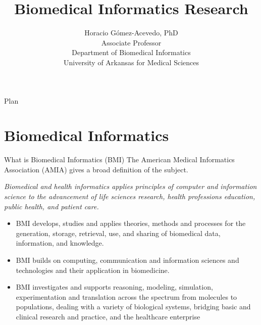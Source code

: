 \documentclass[11pt, aspectratio=43]{beamer}
\title{Biomedical Informatics Research}
\author{Horacio G\'omez-Acevedo, PhD\\ Associate Professor\\Department of Biomedical Informatics\\
	University of Arkansas for Medical Sciences}
\begin{document}
	\begin{frame}[plain]
		\maketitle
	\end{frame}

\begin{frame}{Plan}
	\tableofcontents[hideallsubsections]
\end{frame}

\section{Biomedical Informatics}

\begin{frame}{What is Biomedical Informatics (BMI)}		
	The American Medical Informatics Association (AMIA) gives a broad
	definition of the subject.
	
	{\it
		Biomedical and health informatics applies principles of computer and
		information science to the advancement of life sciences research, health
		professions education, public health, and patient care.}
	\begin{itemize}
		\item BMI develops, studies and applies theories, methods and processes for
		the generation, storage, retrieval, use, and sharing of biomedical data,
		information, and knowledge.
		\item BMI builds on computing, communication and information sciences
		and technologies and their application in biomedicine.
		\item BMI investigates and supports reasoning, modeling, simulation,
		experimentation and translation across the spectrum from molecules to
		populations, dealing with a variety of biological systems, bridging basic
		and clinical research and practice, and the healthcare enterprise
	\end{itemize}
\end{frame}
\end{document}
